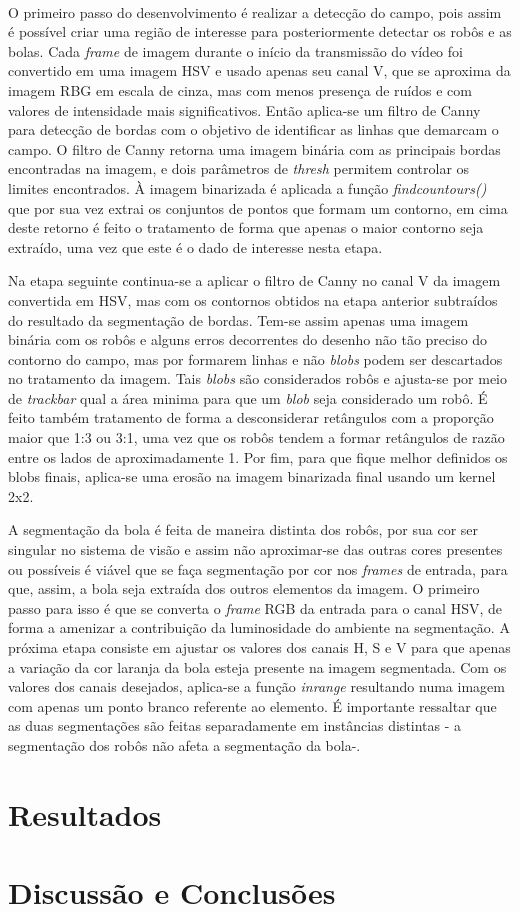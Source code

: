 \documentclass[conference, harvard, brazil, english]{sbatex}
\begin{document}
		\paragraph{}
		O primeiro passo do desenvolvimento é realizar a detecção do campo, pois assim é possível criar uma região de interesse para posteriormente detectar os robôs e as bolas. Cada \textit{frame} de imagem durante o início da transmissão do vídeo foi convertido em uma imagem HSV e usado apenas seu canal V, que se aproxima da imagem RBG em escala de cinza, mas com menos presença de ruídos e com valores de intensidade mais significativos. Então aplica-se um filtro de Canny para detecção de bordas com o objetivo de identificar as linhas que demarcam o campo. O filtro de Canny retorna uma imagem binária com as principais bordas encontradas na imagem, e dois parâmetros de \textit{thresh} permitem controlar os limites encontrados. À imagem binarizada é aplicada a função \textit{findcountours()} que por sua vez extrai os conjuntos de pontos que formam um contorno, em cima deste retorno é feito o tratamento de forma que apenas o maior contorno seja extraído, uma vez que este é o dado de interesse nesta etapa.
		\par Na etapa seguinte continua-se a aplicar o filtro de Canny no canal V da imagem convertida em HSV, mas com os contornos obtidos na etapa anterior subtraídos do resultado da segmentação de bordas. Tem-se assim apenas uma imagem binária com os robôs e alguns erros decorrentes do desenho não tão preciso do contorno do campo, mas por formarem linhas e não \textit{blobs} podem ser descartados no tratamento da imagem. Tais \textit{blobs} são considerados robôs e ajusta-se por meio de \textit{trackbar} qual a área minima para que um \textit{blob} seja considerado um robô. É feito também tratamento de forma a desconsiderar retângulos com a proporção maior que 1:3 ou 3:1, uma vez que os robôs tendem a formar retângulos de razão entre os lados de aproximadamente 1. Por fim, para que fique melhor definidos os blobs finais, aplica-se uma erosão na imagem binarizada final usando um kernel 2x2.
		\par A segmentação da bola é feita de maneira distinta dos robôs, por sua cor ser singular no sistema de visão e assim não aproximar-se das outras cores presentes ou possíveis é viável que se faça segmentação por cor nos \textit{frames} de entrada, para que, assim, a bola seja extraída dos outros elementos da imagem. O primeiro passo para isso é que se converta o \textit{frame} RGB da entrada para o canal HSV, de forma a amenizar a contribuição da luminosidade do ambiente na segmentação. A próxima etapa consiste em ajustar os valores dos canais H, S e V para que apenas a variação da cor laranja da bola esteja presente na imagem segmentada. Com os valores dos canais desejados, aplica-se a função \textit{inrange} resultando numa imagem com apenas um ponto branco referente ao elemento. É importante ressaltar que as duas segmentações são feitas separadamente em instâncias distintas - a segmentação dos robôs não afeta a segmentação da bola-.
	\section{Resultados}
			
	\section{Discussão e Conclusões}
	
\end{document}
